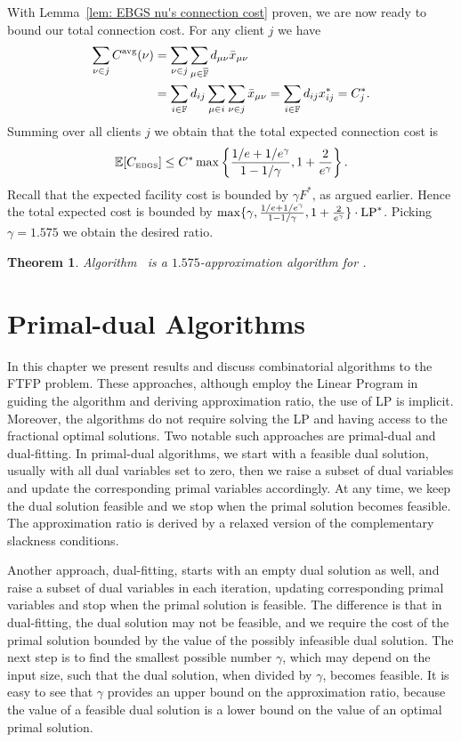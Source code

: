 \documentclass[oneside,final]{ucr}
\newtheorem{theorem}{Theorem}
\begin{document}
With Lemma~\ref{lem: EBGS nu's connection cost} proven, we are now ready to bound our total connection cost.
For any client $j$ we have
%
\begin{align*}
\sum_{\nu\in j} C^{{\mbox{\scriptsize\rm avg}}}(\nu)
	&= \sum_{\nu\in j}\sum_{\mu\in\overline{\mathbb{F}}} d_{\mu\nu}{\bar x}_{\mu\nu} 
	\\
	&= \sum_{i\in\mathbb{F}}d_{ij}\sum_{\mu\in i}\sum_{\nu\in j} {\bar x}_{\mu\nu}
	= \sum_{i\in\mathbb{F}} d_{ij}x_{ij}^\ast = C_j^\ast.
\end{align*}
% 
Summing over all clients $j$ we obtain that the total expected connection cost is
%
\begin{equation*}
	\mathbb{E}[ C_{\mbox{\tiny\rm EBGS}} ] \le  C^\ast\max\left\{\frac{1/e+1/e^\gamma}{1-1/\gamma}, 1+\frac{2}{e^\gamma}\right\}.
\end{equation*}
%
Recall that the expected facility cost is bounded by $\gamma F^\ast$,
as argued earlier. Hence the total expected cost is bounded by $\max\{\gamma,
\frac{1/e+1/e^\gamma}{1-1/\gamma}, 1+\frac{2}{e^\gamma}\}\cdot
\mbox{\rm LP}^\ast$. Picking $\gamma=1.575$ we obtain the desired ratio.


\begin{theorem}\label{thm:ebgs}
  Algorithm~{\EBGS} is a $1.575$-approximation algorithm for \FTFP.
\end{theorem}

\chapter{Primal-dual Algorithms} 
\label{ch: primal-dual} 

In this chapter we present results and discuss combinatorial
algorithms to the FTFP problem. These approaches, although
employ the Linear Program in guiding the algorithm and
deriving approximation ratio, the use of LP is
implicit. Moreover, the algorithms do not require solving
the LP and having access to the fractional optimal
solutions. Two notable such approaches are primal-dual and
dual-fitting. In primal-dual algorithms, we start with a
feasible dual solution, usually with all dual variables set
to zero, then we raise a subset of dual variables and update
the corresponding primal variables accordingly. At any time,
we keep the dual solution feasible and we stop when the
primal solution becomes feasible. The approximation ratio is
derived by a relaxed version of the complementary slackness
conditions.

Another approach, dual-fitting, starts with an empty dual
solution as well, and raise a subset of dual variables in
each iteration, updating corresponding primal variables and
stop when the primal solution is feasible. The difference is
that in dual-fitting, the dual solution may not be feasible,
and we require the cost of the primal solution bounded by
the value of the possibly infeasible dual solution. The next
step is to find the smallest possible number $\gamma$, which
may depend on the input size, such that the dual solution,
when divided by $\gamma$, becomes feasible. It is easy to
see that $\gamma$ provides an upper bound on the
approximation ratio, because the value of a feasible dual
solution is a lower bound on the value of an optimal primal
solution.
\end{document}
